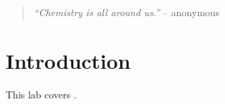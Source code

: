 
\begin{quote}
	\textit{``Chemistry is all around us.''} -- anonymous
\end{quote}

\section{Introduction}




This lab covers  \cite{chemistry3}.




